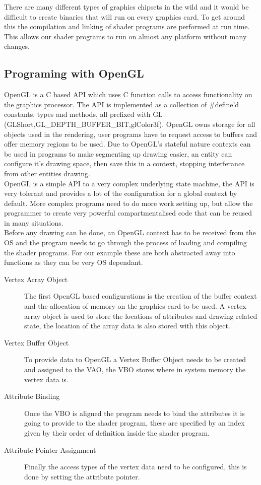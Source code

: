 There are many different types of graphics chipsets in the wild and it would be
difficult to create binaries that will run on every graphics card. To get around
this the compilation and linking of shader programs are performed at run time.
This allows our shader programs to run on almost any platform without many
changes.\\ 

\subsection{Programing with OpenGL}
OpenGL is a C based API which uses C function calls to access functionality on 
the graphics processor. The API is implemented as a collection of \#define'd 
constants, types and methods, all prefixed with GL 
(GLShort,GL\_DEPTH\_BUFFER\_BIT,glColor3f). OpenGL owns storage for all objects
used in the rendering, user programs have to request access to buffers and offer
memory regions to be used. Due to OpenGL's stateful nature contexts can be used 
in programs to make segmenting up drawing easier, an entity can configure it's 
drawing space, then save this in a context, stopping interferance from other 
entities drawing. \\

OpenGL is a simple API to a very complex underlying state machine, the API is 
very tolerant and provides a lot of the configuration for a global context by 
default. More complex programs need to do more work setting up, but allow the
programmer to create very powerful compartmentalised code that can be reused in 
many situations.\\

Before any drawing can be done, an OpenGL context has to be received from the OS
and the program needs to go through the process of loading and compiling the 
shader programs. For our example these are both abstracted away into functions as
they can be very OS dependant.  \\

\begin{description}
\item[Vertex Array Object] The first OpenGL based configurations is the 
creation of the buffer context and the allocation of memory on the graphics card
to be used. A vertex array object is used to store the locations of attributes 
and drawing related state, the location of the array data is also stored with
this object.
\item[Vertex Buffer Object]
To provide data to OpenGL a Vertex Buffer Object needs to be created
and assigned to the VAO, the VBO stores where in system memory the vertex data 
is. 
\item[Attribute Binding]
Once the VBO is aligned the program needs to bind the attributes it is going
to provide to the shader program, these are specified by an index given by their
order of definition inside the shader program.
\item[Attribute Pointer Assignment]
Finally the access types of the 
vertex data need to be configured, this is done by setting the attribute 
pointer. 
\end{description}

